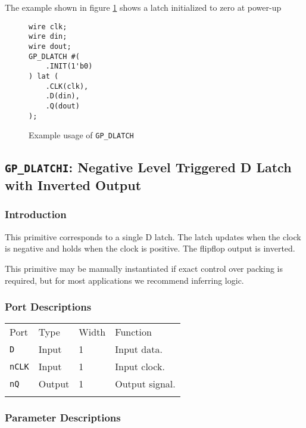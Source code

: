 \documentclass[11pt]{article}
\newcommand{\tokenstyle}[1]{\texttt{#1}}
\newcommand{\whenstyle}[1]{{\fontseries{sb}\selectfont#1}}
\newcommand{\thinhline}{\Xhline{1\arrayrulewidth}}
\newcommand{\thickhline}{\Xhline{2.5\arrayrulewidth}}
\begin{document}
The example shown in figure \ref{gp-dlatch-example} shows a latch initialized to zero at power-up

\begin{figure}[h]
\begin{lstlisting}
wire clk;
wire din;
wire dout;
GP_DLATCH #(
	.INIT(1'b0)
) lat (
	.CLK(clk),
	.D(din),
	.Q(dout)
);
\end{lstlisting}
\caption{Example usage of \tokenstyle{GP\_DLATCH}}
\label{gp-dlatch-example}
\end{figure}


\pagebreak
\subsection{\tokenstyle{GP\_DLATCHI}: Negative Level Triggered D Latch with Inverted Output}
\label{gp-latchi}

\subsubsection{Introduction}
This primitive corresponds to a single D latch. The latch updates when the clock is negative and holds 
when the clock is positive. The flipflop output is inverted.

This primitive may be manually instantiated if exact control over packing is required, but for most applications we
recommend inferring logic.

\subsubsection{Port Descriptions}

\begin{tabularx}{\textwidth}{lllX}
\thinhline
\whenstyle{Port} & \whenstyle{Type} & \whenstyle{Width} & \whenstyle{Function} \\
\thickhline
\tokenstyle{D} & Input & 1 & Input data. \\
\thinhline
\tokenstyle{nCLK} & Input & 1 & Input clock. \\
\thinhline
\tokenstyle{nQ} & Output & 1 & Output signal. \\
\thinhline
\end{tabularx}

\subsubsection{Parameter Descriptions}
\end{document}
